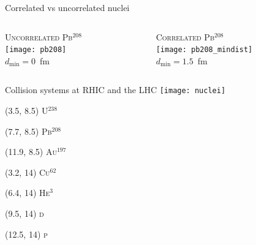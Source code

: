 \documentclass{beamer}
\begin{document}
\begin{frame}{Correlated vs uncorrelated nuclei}
  \begin{columns}
    \begin{column}{.5\textwidth}
      \centering
      {\scshape Uncorrelated Pb$^{208}$} \\
      \texttt{[image: pb208]} \\
      $d_\mathrm{min}=0$~fm
    \end{column}
    \vline
    \begin{column}{.5\textwidth}
      \centering
      {\scshape Correlated Pb$^{208}$} \\
      \texttt{[image: pb208\_mindist]} \\
      $d_\mathrm{min}=1.5$~fm
    \end{column}
  \end{columns}
\end{frame}

\begin{frame}{Collision systems at RHIC and the LHC}
  \centering
  \texttt{[image: nuclei]}

  \begin{textblock}{1}(3.5, 8.5)
    \centering\scshape U$^{238}$
  \end{textblock}

  \begin{textblock}{1}(7.7, 8.5)
    \centering\scshape Pb$^{208}$
  \end{textblock}
  
  \begin{textblock}{1}(11.9, 8.5)
    \centering\scshape Au$^{197}$
  \end{textblock}

  \begin{textblock}{1}(3.2, 14)
    \centering\scshape Cu$^{62}$
  \end{textblock}

  \begin{textblock}{1}(6.4, 14)
    \centering\scshape He$^{3}$
  \end{textblock}

  \begin{textblock}{1}(9.5, 14)
    \centering\scshape d
  \end{textblock}

  \begin{textblock}{1}(12.5, 14)
    \centering\scshape p
  \end{textblock}

\end{frame}
\end{document}
